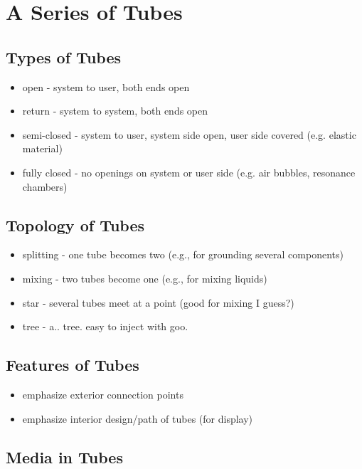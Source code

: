 \section{A Series of Tubes}

\subsection{Types of Tubes}

\begin{itemize}
\item open - system to user, both ends open
\item return - system to system, both ends open
\item semi-closed - system to user, system side open, user side covered (e.g. elastic material)
\item fully closed - no openings on system or user side (e.g. air bubbles, resonance chambers)
\end{itemize}

\subsection{Topology of Tubes}

\begin{itemize}
\item splitting - one tube becomes two (e.g., for grounding several components)
\item mixing - two tubes become one (e.g., for mixing liquids)
\item star - several tubes meet at a point (good for mixing I guess?)
\item tree - a.. tree.  easy to inject with goo.
\end{itemize}

\subsection{Features of Tubes}

\begin{itemize}
\item emphasize exterior connection points
\item emphasize interior design/path of tubes (for display)
\end{itemize}

\subsection{Media in Tubes}

